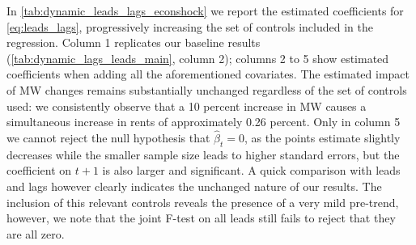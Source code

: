 
In \autoref{tab:dynamic_leads_lags_econshock} we report the estimated coefficients for 
\autoref{eq:leads_lags}, progressively increasing the set of controls included in the regression. 
Column 1 replicates our baseline results (\autoref{tab:dynamic_lags_leads_main}, column 2); columns 
2 to 5 show estimated coefficients when adding all the aforementioned covariates. The estimated 
impact of MW changes remains substantially unchanged regardless of the set of controls used: we 
consistently observe that a 10 percent increase in MW causes a simultaneous increase in rents of 
approximately 0.26 percent. Only in column 5 we cannot reject the null hypothesis that 
$\hat{\beta}_{t} = 0$, as the points estimate slightly decreases while the smaller sample size 
leads to higher standard errors, but the coefficient on $t+1$ is also larger and significant. A 
quick comparison with leads and lags however clearly indicates the unchanged nature of our results. 
The inclusion of this relevant controls reveals the presence of a very mild pre-trend, however, we 
note that the joint F-test on all leads still fails to reject that they are all zero.   


